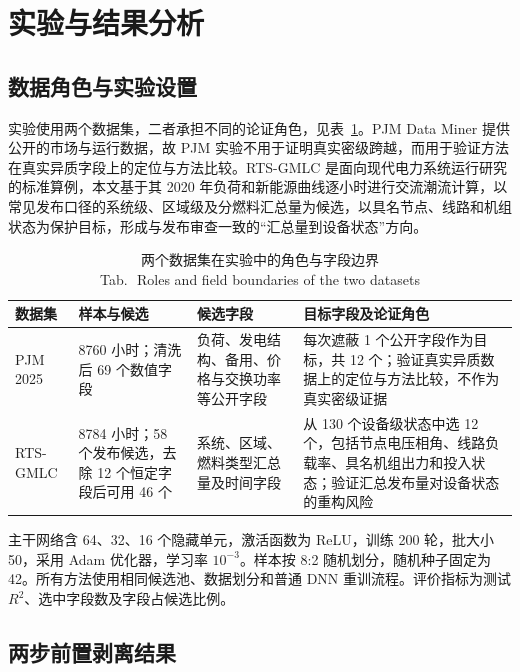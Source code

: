 \documentclass[UTF8,zihao=5,twoside,fontset=none]{ctexart}
\newcommand{\tabbicaption}[2]{\caption{#1\\[-0.2em]\small Tab.\,\thetable\ #2}}
\begin{document}
\section{实验与结果分析}

\subsection{数据角色与实验设置}

实验使用两个数据集，二者承担不同的论证角色，见表~\ref{tab:data}。PJM Data Miner 提供公开的市场与运行数据\cite{ref-ma-pjm,ref-pjm-dataminer}，故 PJM 实验不用于证明真实密级跨越，而用于验证方法在真实异质字段上的定位与方法比较。RTS-GMLC 是面向现代电力系统运行研究的标准算例\cite{ref-rtsgmlc}，本文基于其 2020 年负荷和新能源曲线逐小时进行交流潮流计算，以常见发布口径的系统级、区域级及分燃料汇总量为候选，以具名节点、线路和机组状态为保护目标，形成与发布审查一致的“汇总量到设备状态”方向。

\begin{table}[!tbp]
\centering
\tabbicaption{两个数据集在实验中的角色与字段边界}{Roles and field boundaries of the two datasets}
\label{tab:data}
\setlength{\tabcolsep}{4.5pt}
\begin{tabular}{p{2.1cm}p{2.0cm}p{4.7cm}p{5.4cm}}
\toprule
数据集 & 样本与候选 & 候选字段 & 目标字段及论证角色 \\
\midrule
PJM 2025 & 8760 小时；清洗后 69 个数值字段 & 负荷、发电结构、备用、价格与交换功率等公开字段 & 每次遮蔽 1 个公开字段作为目标，共 12 个；验证真实异质数据上的定位与方法比较，不作为真实密级证据 \\
RTS-GMLC & 8784 小时；58 个发布候选，去除 12 个恒定字段后可用 46 个 & 系统、区域、燃料类型汇总量及时间字段 & 从 130 个设备级状态中选 12 个，包括节点电压相角、线路负载率、具名机组出力和投入状态；验证汇总发布量对设备状态的重构风险 \\
\bottomrule
\end{tabular}
\end{table}

主干网络含 64、32、16 个隐藏单元，激活函数为 ReLU，训练 200 轮，批大小 50，采用 Adam 优化器\cite{ref-kingma-adam}，学习率 $10^{-3}$。样本按 8:2 随机划分，随机种子固定为 42。所有方法使用相同候选池、数据划分和普通 DNN 重训流程。评价指标为测试 $R^2$、选中字段数及字段占候选比例。

\subsection{两步前置剥离结果}
\end{document}
